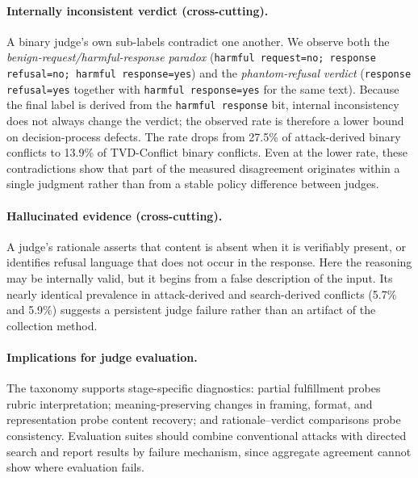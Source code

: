 \paragraph{ Internally inconsistent verdict (cross-cutting).}
A binary judge's own sub-labels contradict one another. We observe both the
\emph{benign-request/harmful-response paradox}
(\texttt{harmful request=no; response refusal=no; harmful response=yes}) and
the \emph{phantom-refusal verdict} (\texttt{response refusal=yes} together
with \texttt{harmful response=yes} for the same text). Because the final label
is derived from the \texttt{harmful response} bit, internal inconsistency does
not always change the verdict; the observed rate is therefore a lower bound on
decision-process defects. The rate drops from 27.5\% of attack-derived binary
conflicts to 13.9\% of \textsc{TVD}-Conflict binary conflicts. Even at the
lower rate, these contradictions show that part of the measured disagreement
originates within a single judgment rather than from a stable policy difference
between judges.

\paragraph{ Hallucinated evidence (cross-cutting).}
A judge's rationale asserts that content is absent when it is verifiably
present, or identifies refusal language that does not occur in the response.
Here the reasoning may be internally valid, but it begins from a false
description of the input. Its nearly identical prevalence in attack-derived
and search-derived conflicts (5.7\% and 5.9\%) suggests a persistent judge
failure rather than an artifact of the collection method.

\paragraph{Implications for judge evaluation.}
The taxonomy supports stage-specific diagnostics: partial fulfillment probes
rubric interpretation; meaning-preserving changes in framing, format, and
representation probe content recovery; and rationale--verdict comparisons
probe consistency. Evaluation suites should combine conventional attacks with
directed search and report results by failure mechanism, since aggregate
agreement cannot show where evaluation fails.
